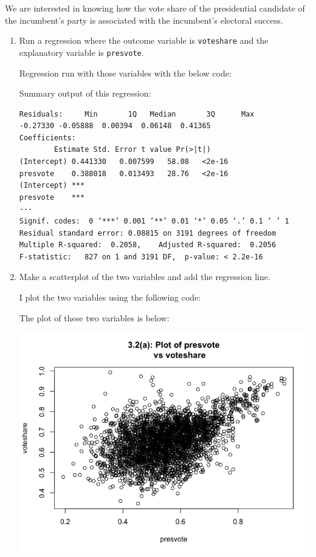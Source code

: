 \documentclass[12pt,letterpaper]{article}
\begin{document}
\noindent We are interested in knowing how the vote share of the presidential candidate of the incumbent's party is associated with the incumbent's electoral success.
	\vspace{.25cm}
	\begin{enumerate}
		\item Run a regression where the outcome variable is \texttt{voteshare} and the explanatory variable is \texttt{presvote}.
		
Regression run with those variables with the below code:
	
	
Summary output of this regression:
			\begin{verbatim}
Residuals:     Min       1Q   Median       3Q      Max 
-0.27330 -0.05888  0.00394  0.06148  0.41365 
Coefficients:            
		Estimate Std. Error t value Pr(>|t|)
(Intercept) 0.441330   0.007599   58.08   <2e-16
presvote    0.388018   0.013493   28.76   <2e-16               
(Intercept) ***
presvote    ***
---
Signif. codes:  0 ‘***’ 0.001 ‘**’ 0.01 ‘*’ 0.05 ‘.’ 0.1 ‘ ’ 1
Residual standard error: 0.08815 on 3191 degrees of freedom
Multiple R-squared:  0.2058,	Adjusted R-squared:  0.2056 
F-statistic:   827 on 1 and 3191 DF,  p-value: < 2.2e-16
\end{verbatim} 

			\vspace{2cm}
		\item Make a scatterplot of the two variables and add the regression line.

I plot the two variables using the following code:
	
The plot of these two variables is below:

\begin{center}	
	\includegraphics[scale=.80]{Plot3.2(a).png}		\end{center}


\end{enumerate}
\end{document}
